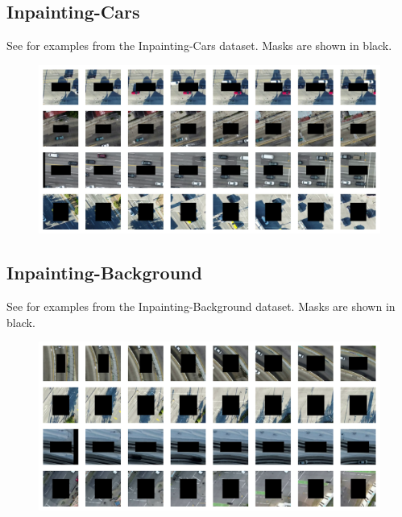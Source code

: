 \subsection{Inpainting-Cars}
See  for examples from the Inpainting-Cars dataset. Masks are shown in black.
\begin{figure}[h!]
\begin{center}
    \centering
    \captionsetup{type=figure}
    \includegraphics[width=\linewidth]{figures/dataset-examples/cars-examples.pdf}
    \label{fig:cars-examples}
\end{center}
\end{figure}
\subsection{Inpainting-Background}
See  for examples from the Inpainting-Background dataset. Masks are shown in black.
\begin{figure}[h!]
\begin{center}
    \centering
    \captionsetup{type=figure}
    \includegraphics[width=\linewidth]{figures/dataset-examples/bg-examples.pdf}
    \label{fig:bg-examples}
\end{center}
\end{figure}

